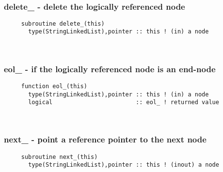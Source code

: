 
\mbox{}\hrulefill\ 

  \subsubsection{delete\_ - delete the logically referenced node}

\begin{verbatim} 
     subroutine delete_(this)
       type(StringLinkedList),pointer :: this ! (in) a node
 \end{verbatim}%
 
 
\mbox{}\hrulefill\ 
 
  \subsubsection{eol\_ - if the logically referenced node is an end-node}

\begin{verbatim} 
     function eol_(this)
       type(StringLinkedList),pointer :: this ! (in) a node
       logical                        :: eol_ ! returned value
 \end{verbatim}%
 
 
\mbox{}\hrulefill\ 
 
  \subsubsection{next\_ - point a reference pointer to the next node}

\begin{verbatim} 
     subroutine next_(this)
       type(StringLinkedList),pointer :: this ! (inout) a node
 \end{verbatim}%
 
